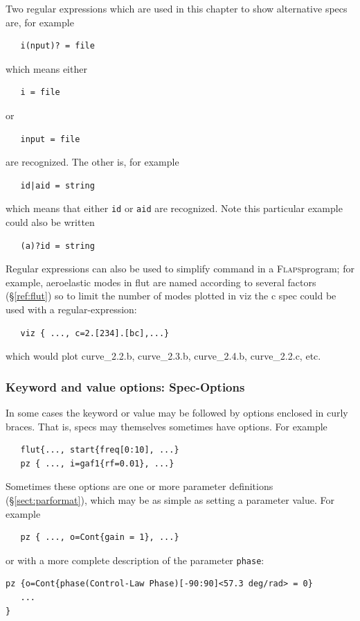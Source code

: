 \documentclass[11pt,openany,twoside]{book}
\numberwithin{equation}{section}		%
\newcommand{\Cmd}[1]{{\sf #1}}
\newcommand{\Code}[1]{{\small\tt #1}}
\newcommand{\Subst}[1]{{\small\sf #1}}
\newcommand{\Flaps}{\textsc{Flaps\:}}
\newcommand{\Spec}[1]{{\small\ttfamily #1}}
\newcommand{\Sectref}[1]{\S\ref{#1}}
\begin{document}
Two regular expressions which are used in this chapter to
show alternative specs are, for example
\begin{lstlisting}
   i(nput)? = file
\end{lstlisting}
which means either
\begin{lstlisting}
   i = file
\end{lstlisting}
or
\begin{lstlisting}
   input = file
\end{lstlisting}
are recognized. The other is, for example
\begin{lstlisting}
   id|aid = string
\end{lstlisting}
which means that either \Code{id} or \Code{aid} are recognized.
Note this particular example could also be written
\begin{lstlisting}
   (a)?id = string
\end{lstlisting}

Regular expressions can also be used to simplify command in
a \Flaps program;
for example, aeroelastic modes in \Cmd{flut} are named according to
several factors (\Sectref{ref:flut}) so to limit the number of modes
plotted in \Cmd{viz} the \Spec{c} spec could be used with a
regular-expression:
\begin{lstlisting}
   viz { ..., c=2.[234].[bc],...}
\end{lstlisting}
which would plot curve\_2.2.b, curve\_2.3.b, curve\_2.4.b, curve\_2.2.c, etc.


\subsubsection{Keyword and value options: Spec-Options}
In some cases the \Subst{keyword} or \Subst{value} may be followed by
options enclosed in curly braces. That is, specs may themselves
sometimes have options.
For example
\begin{lstlisting}
   flut{..., start{freq[0:10], ...}
   pz { ..., i=gaf1{rf=0.01}, ...}
\end{lstlisting}

Sometimes these options are
one or more parameter definitions (\Sectref{sect:parformat}),
which may be as simple as setting a parameter value. For example
\begin{lstlisting}
   pz { ..., o=Cont{gain = 1}, ...}
\end{lstlisting}

or with a more complete description of the parameter \Code{phase}:
\begin{lstlisting}
pz {o=Cont{phase(Control-Law Phase)[-90:90]<57.3 deg/rad> = 0}
   ...
}
\end{lstlisting}
\end{document}
